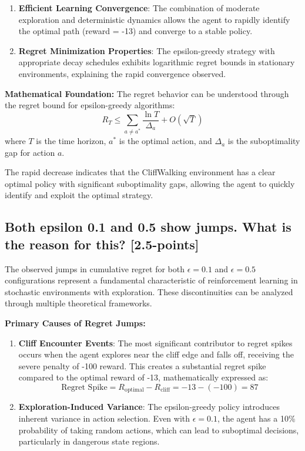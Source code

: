 \documentclass[12pt]{article}
\begin{document}
{{{\begin{enumerate}
    \item \textbf{Efficient Learning Convergence}: The combination of moderate exploration and deterministic dynamics allows the agent to rapidly identify the optimal path (reward = -13) and converge to a stable policy.
    
    \item \textbf{Regret Minimization Properties}: The epsilon-greedy strategy with appropriate decay schedules exhibits logarithmic regret bounds in stationary environments, explaining the rapid convergence observed.
\end{enumerate}

\textbf{Mathematical Foundation:}
The regret behavior can be understood through the regret bound for epsilon-greedy algorithms:
$$R_T \leq \sum_{a \neq a^*} \frac{\ln T}{\Delta_a} + O(\sqrt{T})$$
where $T$ is the time horizon, $a^*$ is the optimal action, and $\Delta_a$ is the suboptimality gap for action $a$.

The rapid decrease indicates that the CliffWalking environment has a clear optimal policy with significant suboptimality gaps, allowing the agent to quickly identify and exploit the optimal strategy.

\subsection{Both epsilon 0.1 and 0.5 show jumps. What is the reason for this? [2.5-points]}

The observed jumps in cumulative regret for both $\epsilon = 0.1$ and $\epsilon = 0.5$ configurations represent a fundamental characteristic of reinforcement learning in stochastic environments with exploration. These discontinuities can be analyzed through multiple theoretical frameworks.

\textbf{Primary Causes of Regret Jumps:}

\begin{enumerate}
    \item \textbf{Cliff Encounter Events}: The most significant contributor to regret spikes occurs when the agent explores near the cliff edge and falls off, receiving the severe penalty of -100 reward. This creates a substantial regret spike compared to the optimal reward of -13, mathematically expressed as:
    $$\text{Regret Spike} = R_{\text{optimal}} - R_{\text{cliff}} = -13 - (-100) = 87$$
    
    \item \textbf{Exploration-Induced Variance}: The epsilon-greedy policy introduces inherent variance in action selection. Even with $\epsilon = 0.1$, the agent has a 10\% probability of taking random actions, which can lead to suboptimal decisions, particularly in dangerous state regions.
    

\end{enumerate}}}}
\end{document}
